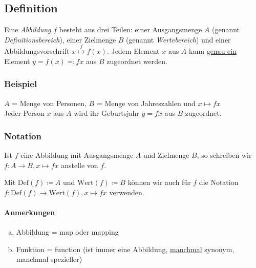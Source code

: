 \subsection{Definition}
Eine \emph{Abbildung} $f$ besteht aus drei Teilen: einer Ausgangsmenge $A$
(genannt \emph{Definitionsbereich}), einer Zielmenge $B$ (genannt
\emph{Wertebereich}) und einer Abbildungsvorschrift $x \overset{f}{\mapsto}
f(x)$. Jedem Element $x$ aus $A$ kann \underline{genau ein} Element $y = f(x)
\eqcolon fx$ aus $B$ zugeordnet werden.

\subsubsection{Beispiel}
$A$ = Menge von Personen, $B$ = Menge von Jahreszahlen und $x \mapsto
fx$\\
Jeder Person $x$ aus $A$ wird ihr Geburtsjahr $y = fx$ aus $B$ zugeordnet.

\subsubsection{Notation}
Ist $f$ eine Abbildung mit Ausgangsmenge $A$ und Zielmenge $B$, so schreiben
wir $f \colon A \rightarrow B, x \mapsto fx$ anstelle von $f$.

Mit $\text{Def}(f) \coloneq A$ und $\text{Wert}(f) \coloneq B$ können wir auch
für $f$ die Notation $f \colon \text{Def}(f) \rightarrow \text{Wert}(f), x
\mapsto fx$ verwenden.

\paragraph{Anmerkungen}
\begin{enumerate}[(a)]
  \item Abbildung = map oder mapping
  \item Funktion = function (ist immer eine Abbildung, \underline{manchmal}
  synonym, manchmal spezieller)
\end{enumerate}

%
%
%
%
%
%
